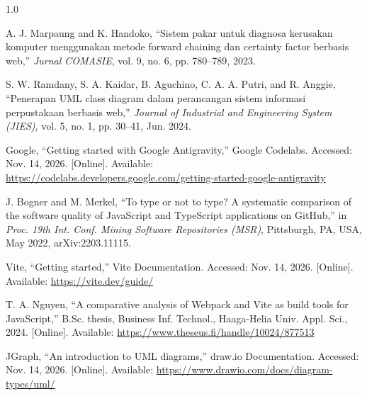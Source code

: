 \documentclass[12pt,a4paper,twoside]{report}
\begin{document}
\begin{spacing}{1.0}
\begin{enumerate}[label={[\arabic*]},leftmargin=0.9cm,itemsep=5pt,topsep=2pt]
  \item A. J. Marpaung and K. Handoko, ``Sistem pakar untuk diagnosa kerusakan komputer menggunakan metode forward chaining dan certainty factor berbasis web,'' \textit{Jurnal COMASIE}, vol. 9, no. 6, pp. 780--789, 2023.

  \item S. W. Ramdany, S. A. Kaidar, B. Aguchino, C. A. A. Putri, and R. Anggie, ``Penerapan UML class diagram dalam perancangan sistem informasi perpustakaan berbasis web,'' \textit{Journal of Industrial and Engineering System (JIES)}, vol. 5, no. 1, pp. 30--41, Jun. 2024.

  \item Google, ``Getting started with Google Antigravity,'' Google Codelabs. Accessed: Nov. 14, 2026. [Online]. Available: \url{https://codelabs.developers.google.com/getting-started-google-antigravity}

  \item J. Bogner and M. Merkel, ``To type or not to type? A systematic comparison of the software quality of JavaScript and TypeScript applications on GitHub,'' in \textit{Proc. 19th Int. Conf. Mining Software Repositories (MSR)}, Pittsburgh, PA, USA, May 2022, arXiv:2203.11115.

  \item Vite, ``Getting started,'' Vite Documentation. Accessed: Nov. 14, 2026. [Online]. Available: \url{https://vite.dev/guide/}

  \item T. A. Nguyen, ``A comparative analysis of Webpack and Vite as build tools for JavaScript,'' B.Sc. thesis, Business Inf. Technol., Haaga-Helia Univ. Appl. Sci., 2024. [Online]. Available: \url{https://www.theseus.fi/handle/10024/877513}

  \item JGraph, ``An introduction to UML diagrams,'' draw.io Documentation. Accessed: Nov. 14, 2026. [Online]. Available: \url{https://www.drawio.com/docs/diagram-types/uml/}

\end{enumerate}
\end{spacing}
\endgroup
\end{document}
